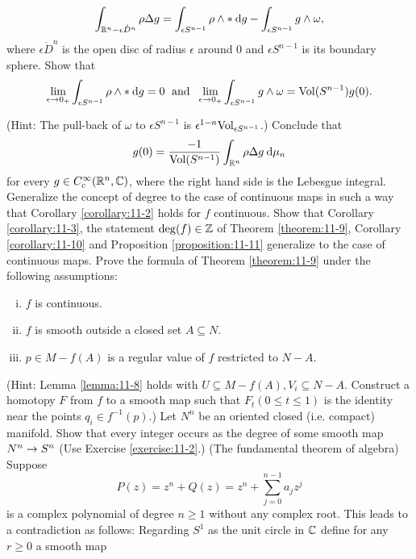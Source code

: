 \begin{enumerate}[label=\theexercise.\arabic*.,ref=\theexercise.\arabic*,leftmargin=2.7em]
    \[
     \int_{{\RR}^{n}- \epsilon {\mathring{D}}^{n}}{\rho \Delta g} =\int_{\epsilon {S}^{n- 1}}\rho\land *{\dd g}-\int_{\epsilon {S}^{n- 1}}g \land  \omega,
    \]
    where $\epsilon {\mathring{D}}^{n}$ is the open disc of radius $\epsilon$ around 0 and $\epsilon {S}^{n- 1}$ is its boundary sphere. Show that
    \[
      \mathop{\lim }\limits_{{\epsilon  \ra  {0}_{ + }}}\int_{\epsilon {S}^{n- 1}}\rho  \land   * {\dd g} = 0\;\text{ and }\;\mathop{\lim }\limits_{{\epsilon  \ra  {0}_{ + }}}\int_{\epsilon {S}^{n- 1}}g \land  \omega  = \R{Vol}( {S}^{n- 1}) g( 0).
    \]
    \par(Hint: The pull-back of $\omega$ to $\epsilon {S}^{n- 1}$ is ${\epsilon }^{1- n}{\mathrm{Vol}}_{\epsilon {S}^{n- 1}}$.) Conclude that
    \[
      g( 0)  = \frac{-1}{\R{Vol}( {S}^{n- 1}) }\int_{{\RR}^{n}}{\rho \Delta g\dd}{\mu }_{n}
    \]
    for every $g \in  {C}_{c}^{\infty }( {{\mathbb{R}}^{n},\mathbb{C}})$, where the right hand side is the Lebesgue integral.
  \newchap[11]
  \NewItem Generalize the concept of degree to the case of continuous maps in such a way that Corollary \ref{corollary:11-2} holds for $f$ continuous.
    Show that Corollary \ref{corollary:11-3}, the statement $\deg ( f)  \in  \mathbb{Z}$ of Theorem \ref{theorem:11-9}, Corollary \ref{corollary:11-10} and Proposition \ref{proposition:11-11} generalize to the case of continuous maps.
  \NewItem Prove the formula of Theorem \ref{theorem:11-9} under the following assumptions:
  \begin{enumerate}[(i)]
    \item $f$ is continuous.
    \item $f$ is smooth outside a closed set $A \subseteq  N$.
    \item $p \in  M-f( A)$ is a regular value of $f$ restricted to $N- A$.
  \end{enumerate}\par(Hint: Lemma \ref{lemma:11-8} holds with $U \subseteq  M- f( A),{V}_{i} \subseteq  N- A$. Construct a homotopy $F$ from $f$ to a smooth map such that ${F}_{t}( {0 \leq  t \leq  1})$ is the identity near the points ${q}_{i} \in  {f}^{-1}( p)$.)
  \NewItem Let ${N}^{n}$ be an oriented closed (i.e. compact) manifold. Show that every integer occurs as the degree of some smooth map ${N}^{n} \rightarrow  {S}^{n}$ (Use Exercise \ref{exercise:11-2}.)
  \NewItem (The fundamental theorem of algebra) Suppose
    \[
      P( z)  = {z}^{n} + Q( z)  = {z}^{n} + \sum_{{j = 0}}^{{n- 1}}{a}_{j}{z}^{j}
    \]
    is a complex polynomial of degree $n \geq  1$ without any complex root. This leads to a contradiction as follows: Regarding ${S}^{1}$ as the unit circle in $\mathbb{C}$ define for any $r \geq  0$ a smooth map

\end{enumerate}
